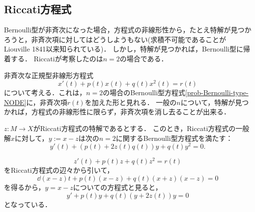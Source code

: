 \documentclass[uplatex,dvipdfmx]{jsreport}
\begin{document}
\subsection{Riccati方程式}

\begin{tcolorbox}[colframe=ForestGreen, colback=ForestGreen!10!white,breakable,colbacktitle=ForestGreen!40!white,coltitle=black,fonttitle=\bfseries\sffamily,
title=]
    Bernoulli型が非斉次になった場合，方程式の非線形性から，たとえ特解が見つかろうと，非斉次項に対してはどうしようもない(求積不可能であることがLiouville 1841以来知られている)．
    しかし，特解が見つかれば，Bernoulli型に帰着する．
    Riccatiが考察したのは$n=2$の場合である．
\end{tcolorbox}

\begin{problem}\label{prob-Riccati-type-NODE}
    非斉次な正規型非線形方程式
    \[x'(t)+p(t)x(t)+q(t)x^2(t)=r(t)\]
    について考える．これは，$n=2$の場合のBernoulli型方程式\ref{prob-Bernoulli-type-NODE}に，非斉次項$r(t)$を加えた形と見れる．
    一般の$n$について，特解が見つかれば，方程式の非線形性に限らず，非斉次項を消し去ることが出来る．
\end{problem}

\begin{proposition}
    $z:M\to X$がRiccati方程式の特解であるとする．
    このとき，Riccati方程式の一般解$x$に対して，$y:=x-z$は次の$n=2$に関するBernoulli型方程式を満たす：
    \[y'(t)+(p(t)+2z(t)q(t))y+q(t)y^2=0.\]
\end{proposition}
\begin{Proof}
    \[z'(t)+p(t)z+q(t)z^2=r(t)\]
    をRiccati方程式の辺々から引いて，
    \[\dd{(x-z)}{t}+p(t)(x-z)+q(t)(x+z)(x-z)=0\]
    を得るから，$y=x-z$についての方程式と見ると，
    \[y'+p(t)y+q(t)(y+2z(t))y=0\]
    となっている．
\end{Proof}
\end{document}
